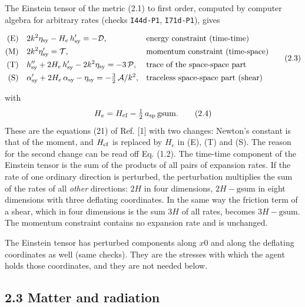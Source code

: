 \documentclass[
  10pt,
]{article}
\begin{document}
The Einstein tensor of the metric (2.1) to first order, computed by
computer algebra for arbitrary rates (checks \texttt{I44d-P1},
\texttt{I71d-P1}), gives

\[\begin{aligned}
\text{(E)}\quad& 2k^2\eta_{\rm sy}-H_e\,h_{\rm sy}'=-\mathcal D, &&\text{energy constraint (time-time)}\\
\text{(M)}\quad& 2k^2\eta_{\rm sy}'=\mathcal T, &&\text{momentum constraint (time-space)}\\
\text{(T)}\quad& h_{\rm sy}''+2H_e\,h_{\rm sy}'-2k^2\eta_{\rm sy}=-3\,\mathcal P, &&\text{trace of the space-space part}\\
\text{(S)}\quad& \alpha_{\rm sy}'+2H_e\,\alpha_{\rm sy}-\eta_{\rm sy}=-\tfrac32\,\mathcal A/k^2, &&\text{traceless space-space part (shear)}
\end{aligned}\tag{2.3}\]

with \[H_e=H_{\rm cf}-\tfrac12\,a_{\rm sp}\,\mathrm{gsum}.\tag{2.4}\]
These are the equations (21) of Ref. {[}1{]} with two changes: Newton's
constant is that of the moment, and \(H_{\rm cf}\) is replaced by
\(H_e\) in (E), (T) and (S). The reason for the second change can be
read off Eq. (1.2). The time-time component of the Einstein tensor is
the sum of the products of all pairs of expansion rates. If the rate of
one ordinary direction is perturbed, the perturbation multiplies the sum
of the rates of all \emph{other} directions: \(2H\) in four dimensions,
\(2H-\mathrm{gsum}\) in eight dimensions with three deflating
coordinates. In the same way the friction term of a shear, which in four
dimensions is the sum \(3H\) of all rates, becomes \(3H-\mathrm{gsum}\).
The momentum constraint contains no expansion rate and is unchanged.

The Einstein tensor has perturbed components along \(x0\) and along the
deflating coordinates as well (same checks). They are the stresses with
which the agent holds those coordinates, and they are not needed below.

\hypertarget{matter-and-radiation}{%
\subsection{2.3 Matter and radiation}\label{matter-and-radiation}}
\end{document}
